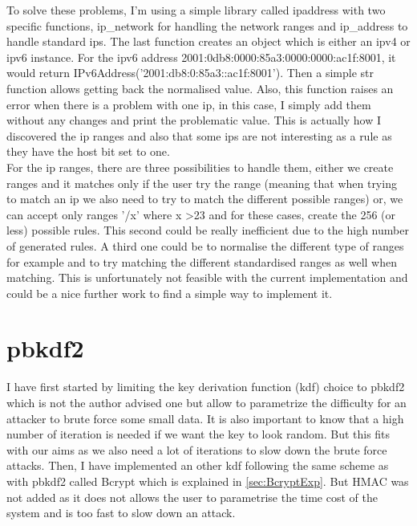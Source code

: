 \documentclass{eplmastersthesis}
\begin{document}
To solve these problems, I'm using a simple library called ipaddress with two specific functions, ip\_network for handling the network ranges and ip\_address to handle standard \glspl{ip}.
The last function creates an object which is either an \gls{ipv4} or \gls{ipv6} instance. For the \gls{ipv6} address 2001:0db8:0000:85a3:0000:0000:ac1f:8001, it would return IPv6Address('2001:db8:0:85a3::ac1f:8001'). Then a simple str function allows getting back the normalised value.
Also, this function raises  an error when there is a problem with one \gls{ip}, in this case, I simply add them without any changes and print the problematic value.
This is actually how I discovered the \gls{ip} ranges and also that some \glspl{ip} are not interesting as a rule as they have the host bit set to one.\\

For the \gls{ip} ranges, there are three possibilities to handle them, either we create ranges and it matches only if the user try the range (meaning that when trying to match an \gls{ip} we also need to try to match the different possible ranges) or, we can accept only ranges '/x' where x >23 and for these cases, create the 256 (or less) possible rules. This second could be really inefficient due to the high number of generated rules. A third one could be to normalise the different type of ranges for example and to try matching the different standardised ranges as well when matching. This is unfortunately not feasible with the current implementation and could be a nice further work to find a simple way to implement it.


\section{\gls{pbkdf2}}
I have first started by limiting the key derivation function (\gls{kdf}) choice to \gls{pbkdf2} which is not the author advised one but allow to parametrize the difficulty for an attacker to brute force some small data. It is also important to know that a high number of iteration is needed if we want the key to look random. But this fits with our aims as we also need a lot of iterations to slow down the brute force attacks.
Then, I have implemented an other \gls{kdf} following the same scheme as with \gls{pbkdf2} called Bcrypt which is explained in \ref{sec:BcryptExp}. 
But HMAC was not added as it does not allows the user to parametrise the time cost of the system and is too fast to slow down an attack.
\end{document}
